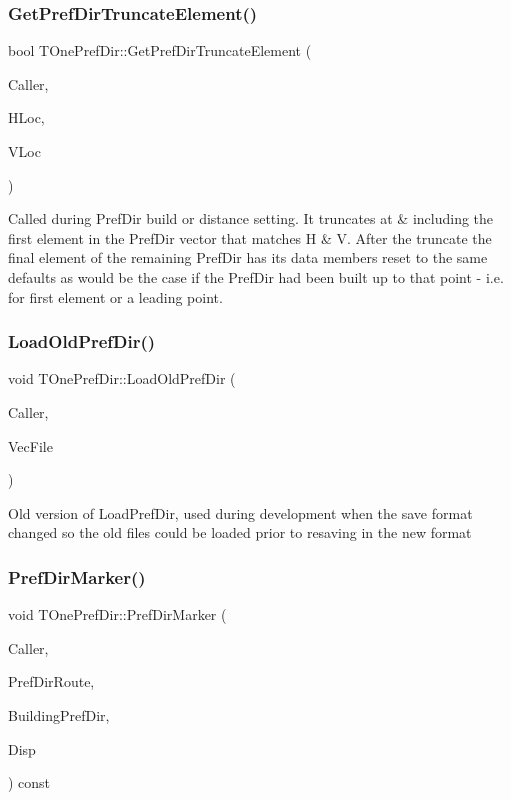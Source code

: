 \subsubsection{\texorpdfstring{Get\+Pref\+Dir\+Truncate\+Element()}{GetPrefDirTruncateElement()}}
{\footnotesize\ttfamily bool T\+One\+Pref\+Dir\+::\+Get\+Pref\+Dir\+Truncate\+Element (\begin{DoxyParamCaption}\item[{int}]{Caller,  }\item[{int}]{H\+Loc,  }\item[{int}]{V\+Loc }\end{DoxyParamCaption})}

Called during Pref\+Dir build or distance setting. It truncates at \& including the first element in the Pref\+Dir vector that matches H \& V. After the truncate the final element of the remaining Pref\+Dir has its data members reset to the same defaults as would be the case if the Pref\+Dir had been built up to that point -\/ i.\+e. for first element or a leading point. \mbox{\label{class_t_one_pref_dir_a614933ff3958e4b8c9be9bc78159d9e8}} 
\subsubsection{\texorpdfstring{Load\+Old\+Pref\+Dir()}{LoadOldPrefDir()}}
{\footnotesize\ttfamily void T\+One\+Pref\+Dir\+::\+Load\+Old\+Pref\+Dir (\begin{DoxyParamCaption}\item[{int}]{Caller,  }\item[{std\+::ifstream \&}]{Vec\+File }\end{DoxyParamCaption})}

Old version of Load\+Pref\+Dir, used during development when the save format changed so the old files could be loaded prior to resaving in the new format \mbox{\label{class_t_one_pref_dir_aef8388386635d73a921fae7ce43f5214}} 
\subsubsection{\texorpdfstring{Pref\+Dir\+Marker()}{PrefDirMarker()}}
{\footnotesize\ttfamily void T\+One\+Pref\+Dir\+::\+Pref\+Dir\+Marker (\begin{DoxyParamCaption}\item[{int}]{Caller,  }\item[{T\+Pref\+Dir\+Route}]{Pref\+Dir\+Route,  }\item[{bool}]{Building\+Pref\+Dir,  }\item[{\mbox{\hyperlink{class_t_display}{T\+Display}} $\ast$}]{Disp }\end{DoxyParamCaption}) const}

